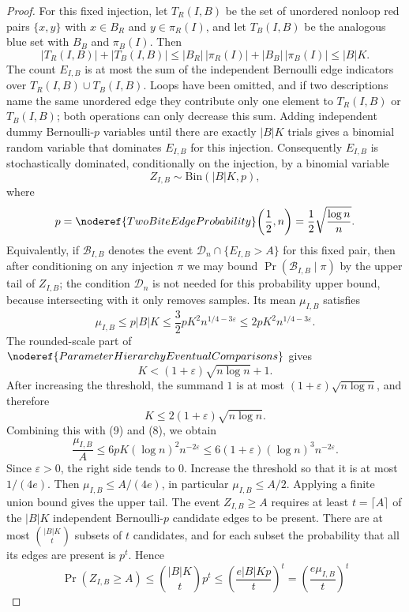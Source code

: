 \begin{proof}
For this fixed injection, let \(T_R(I,B)\) be the set of unordered nonloop red
pairs \(\{x,y\}\) with \(x\in B_R\) and \(y\in\pi_R(I)\), and let
\(T_B(I,B)\) be the analogous blue set with \(B_B\) and \(\pi_B(I)\).  Then
\[
|T_R(I,B)|+|T_B(I,B)|
\le |B_R|\,|\pi_R(I)|+|B_B|\,|\pi_B(I)|
\le |B|K.
\]
The count \(E_{I,B}\) is at most the sum of the independent Bernoulli edge
indicators over \(T_R(I,B)\cup T_B(I,B)\).  Loops have been omitted, and if two
descriptions name the same unordered edge they contribute only one element to
\(T_R(I,B)\) or \(T_B(I,B)\); both operations can only decrease this sum.
Adding independent dummy Bernoulli-\(p\) variables until there are exactly
\(|B|K\) trials gives a binomial random variable that dominates \(E_{I,B}\)
for this injection.  Consequently \(E_{I,B}\) is stochastically dominated,
conditionally on the injection, by a binomial variable
\[
Z_{I,B}\sim\mathrm{Bin}(|B|K,p),
\]
where
\[
p=\noderef{TwoBiteEdgeProbability}\!\left(\frac12,n\right)
=\frac12\sqrt{\frac{\log n}{n}}.
\]
Equivalently, if \(\mathcal B_{I,B}\) denotes the event
\(\mathcal D_n\cap\{E_{I,B}>A\}\) for this fixed pair, then after conditioning
on any injection \(\pi\) we may bound \(\Pr(\mathcal B_{I,B}\mid\pi)\) by the
upper tail of \(Z_{I,B}\); the condition \(\mathcal D_n\) is not needed for
this probability upper bound, because intersecting with it only removes
samples.
Its mean \(\mu_{I,B}\) satisfies
\[
\mu_{I,B}\le p|B|K
\le \frac32pK^2 n^{1/4-3\varepsilon}
\le 2pK^2 n^{1/4-3\varepsilon}. \tag{9}
\]
The rounded-scale part of
\(\noderef{ParameterHierarchyEventualComparisons}\) gives
\[
K<(1+\varepsilon)\sqrt{n\log n}+1.
\]
After increasing the threshold, the summand \(1\) is at most
\((1+\varepsilon)\sqrt{n\log n}\), and therefore
\[
K\le 2(1+\varepsilon)\sqrt{n\log n}.
\]
Combining this with (9) and (8), we obtain
\[
\frac{\mu_{I,B}}{A}
\le 6pK(\log n)^2 n^{-2\varepsilon}
\le 6(1+\varepsilon)(\log n)^3 n^{-2\varepsilon}. \tag{10}
\]
Since \(\varepsilon>0\), the right side tends to \(0\).  Increase the threshold
so that it is at most \(1/(4e)\).  Then
\(\mu_{I,B}\le A/(4e)\), in particular \(\mu_{I,B}\le A/2\).  Applying a finite union bound gives the upper tail. The event \(Z_{I,B}\ge A\) requires at least \(t=\lceil A\rceil\) of the \(|B|K\) independent Bernoulli-\(p\) candidate edges to be present. There are at most \(\binom{|B|K}{t}\) subsets of \(t\) candidates, and for each subset the probability that all its edges are present is \(p^t\). Hence
\[
\Pr(Z_{I,B}\ge A)
\le \binom{|B|K}{t}p^t
\le \left(\frac{e |B| K p}{t}\right)^t
= \left(\frac{e\mu_{I,B}}{t}\right)^t
\]
\end{proof}
